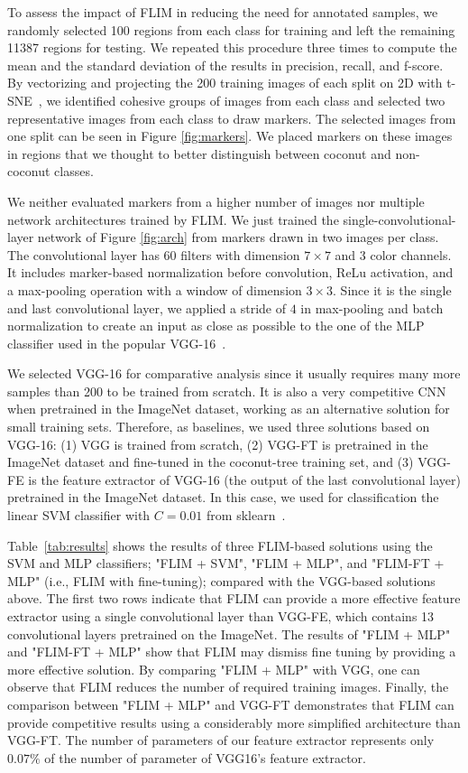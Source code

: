 \documentclass[a4paper,conference]{IEEEtran}
\begin{document}
To assess the impact of FLIM in reducing the need for annotated samples, we randomly selected 100 regions from each class for training and left the remaining 11387 regions for testing. We repeated this procedure three times to compute the mean and the standard deviation of the results in precision, recall, and f-score. By vectorizing and projecting the 200 training images of each split on 2D with t-SNE~\cite{maaten2008visualizing}, we identified cohesive groups of images from each class and selected two representative images from each class to draw markers.  The selected images from one split can be seen in Figure \ref{fig:markers}. We placed markers on these images in regions that we thought to better distinguish between coconut and non-coconut classes.

We neither evaluated markers from a higher number of images nor multiple network architectures trained by FLIM. We just trained the single-convolutional-layer network of Figure \ref{fig:arch} from markers drawn in two images per class.
The convolutional layer has $60$ filters with dimension $7 \times 7$ and 3 color channels. It includes marker-based normalization before convolution, ReLu activation, and a max-pooling operation with a window of dimension $3 \times 3$. Since it is the single and last convolutional layer, we applied a stride of $4$ in max-pooling and batch normalization to create an input as close as possible to the one of the MLP classifier used in the popular VGG-16~\cite{simonyan2014very}.

We selected VGG-16 for comparative analysis since it usually requires many more samples than 200 to be trained from scratch. It is also a very competitive CNN when pretrained in the ImageNet dataset, working as an alternative solution for small training sets. Therefore, as baselines, we used three solutions based on VGG-16: (1) VGG is trained from scratch, (2) VGG-FT is pretrained in the ImageNet dataset and fine-tuned in the coconut-tree training set, and (3) VGG-FE is the feature extractor of VGG-16 (the output of the last convolutional layer) pretrained in the ImageNet dataset. In this case, we used for classification the  linear SVM classifier with $C=0.01$ from sklearn~\cite{fan2008liblinear, scikit-learn}.

Table~\ref{tab:results} shows the results of three FLIM-based solutions using the SVM and MLP classifiers; "FLIM + SVM", "FLIM + MLP", and "FLIM-FT + MLP" (i.e., FLIM with fine-tuning); compared with the VGG-based solutions above. The first two rows indicate that FLIM  can provide a more effective feature extractor using a single convolutional layer than VGG-FE, which contains 13 convolutional layers pretrained on the ImageNet. The results of "FLIM + MLP" and "FLIM-FT + MLP" show that FLIM  may dismiss fine tuning by providing a more effective solution. By comparing "FLIM + MLP" with VGG, one can observe that FLIM reduces the number of required training images. Finally, the comparison between "FLIM + MLP" and VGG-FT demonstrates that FLIM can provide competitive results using a considerably more simplified architecture than  VGG-FT. The number of parameters of our feature extractor represents only $0.07\%$ of the number of parameter of VGG16's feature extractor.
\end{document}
